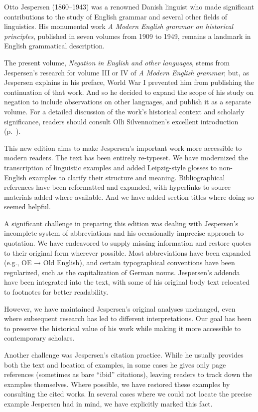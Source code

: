  \label{ch:foreword}

Otto Jespersen (1860--1943) was a renowned Danish linguist who made significant contributions to the study of English grammar and several other fields of linguistics. His monumental work \textit{A Modern English grammar on historical principles}, published in seven volumes from 1909 to 1949, remains a landmark in English grammatical description.

The present volume, \textit{Negation in English and other languages}, stems from Jespersen's research for volume III or IV of \textit{A Modern English grammar}; but, as Jespersen explains in his preface, World War I prevented him from publishing the continuation of that work. And so he decided to expand the scope of his study on negation to include observations on other languages, and publish it as a separate volume. For a detailed discussion of the work's historical context and scholarly significance, readers should consult Olli Silvennoinen's excellent introduction (p.~\pageref{ch:intro}).

This new edition aims to make Jespersen's important work more accessible to modern readers. The text has been entirely re-typeset. We have modernized the transcription of linguistic examples and added Leipzig-style glosses to non-English examples to clarify their structure and meaning. Bibliographical references have been reformatted and expanded, with hyperlinks to source materials added where available. And we have added section titles where doing so seemed helpful.

A significant challenge in preparing this edition was dealing with Jespersen's incomplete system of abbreviations and his occasionally imprecise approach to quotation. We have endeavored to supply missing information and restore quotes to their original form wherever possible. Most abbreviations have been expanded (e.g., OE → Old English), and certain typographical conventions have been regularized, such as the capitalization of German nouns. Jespersen's addenda have been integrated into the text, with some of his original body text relocated to footnotes for better readability.

However, we have maintained Jespersen's original analyses unchanged, even where subsequent research has led to different interpretations. Our goal has been to preserve the historical value of his work while making it more accessible to contemporary scholars.

Another challenge was Jespersen's citation practice. While he usually provides both the text and location of examples, in some cases he gives only page references (sometimes as bare “ibid” citations), leaving readers to track down the examples themselves. Where possible, we have restored these examples by consulting the cited works. In several cases where we could not locate the precise example Jespersen had in mind, we have explicitly marked this fact.

